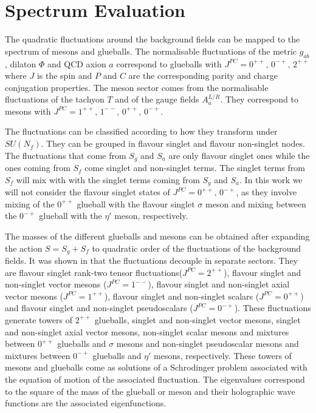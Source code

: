 \documentclass[a4paper,12pt]{article}
\begin{document}
\section{Spectrum Evaluation}

The quadratic fluctuations around the background fields can be mapped to the spectrum of mesons and glueballs. The normalisable fluctuations of the metric $g_{ab}$, dilaton $\Phi$ and QCD axion $a$ correspond to glueballs with $J^{PC} = 0^{++}, \, 0^{-+}, \, 2^{++}$ where $J$ is the spin and $P$ and $C$ are the corresponding parity and charge conjugation properties. The meson sector comes from the normalisable fluctuations of the tachyon $T$ and of the gauge fields $A^{L/R}_{a}$. They correspond to mesons with $J^{PC} = 1^{++}, \, 1^{--}, \, 0^{++}, \, 0^{-+}$. 

The fluctuations can be classified according to how they transform under $SU(N_f)$. They can be grouped in flavour singlet and flavour non-singlet nodes. The fluctuations that come from $S_g$ and $S_a$ are only flavour singlet ones while the ones coming from $S_f$ come singlet and non-singlet terms. The singlet terms from $S_f$ will mix with with the singlet terms coming from $S_g$ and $S_a$. In this work we will not consider the flavour singlet states of $J^{PC} = 0^{++}, \, 0^{-+}$, as they involve mixing of the $0^{++}$ glueball with the flavour singlet $\sigma$ meson and mixing between the $0^{-+}$ glueball with the $\eta'$ meson, respectively.

The masses of the different glueballs and mesons can be obtained after expanding the action $S = S_g + S_f$ to quadratic order of the fluctuations of the background fields. It was shown in \cite{Arean:2013tja} that the fluctuations decouple in separate sectors. They are flavour singlet rank-two tensor fluctuations($J^{PC} = 2^{++}$), flavour singlet and non-singlet vector mesons ($J^{PC} = 1^{--}$), flavour singlet and non-singlet axial vector mesons ($J^{PC} = 1^{++}$), flavour singlet and non-singlet scalars ($J^{PC} = 0^{++}$) and flavour singlet and non-singlet pseudoscalars ($J^{PC} = 0^{-+}$). These fluctuations generate towers of $2^{++}$ glueballs, singlet and non-singlet vector mesons, singlet and non-singlet axial vector mesons, non-singlet scalar mesons and mixtures between $0^{++}$ glueballs and $\sigma$ mesons and non-singlet pseudoscalar mesons and mixtures between 
$0^{-+}$ glueballs and $\eta'$ mesons, respectively. 
These towers of mesons and glueballs come as solutions of a Schrodinger problem associated with the equation of motion of the associated fluctuation. The eigenvalues correspond to the square of the mass of the glueball or meson and their holographic wave functions are the associated eigenfunctions.
\end{document}
